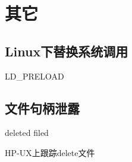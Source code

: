 \chapter{其它}

\section{Linux下替换系统调用}

LD\_PRELOAD

\section{文件句柄泄露}

deleted filed

HP-UX上跟踪delete文件
